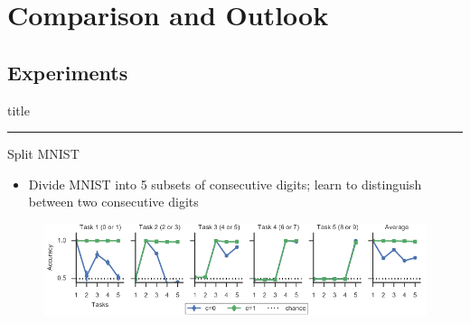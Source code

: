 \documentclass{beamer}
\begin{document}
\section{Comparison and Outlook}
\subsection{Experiments}
\begin{frame}[plain]
\vfill
\centering
\begin{beamercolorbox}[sep=8pt,center,shadow=true,rounded=true]{title}
	\insertsectionhead\par%
	\color{oxfordblue}\noindent\rule{10cm}{1pt}
\end{beamercolorbox}
\vfill
\end{frame}
\begin{frame}{Split MNIST}
\begin{itemize}
	\item Divide MNIST into 5 subsets of consecutive digits; learn to distinguish between two consecutive digits
\end{itemize}
\begin{figure}
	
	\centering
	\includegraphics[width=\textwidth]{ML3}
\end{figure}
\end{frame}
\end{document}
